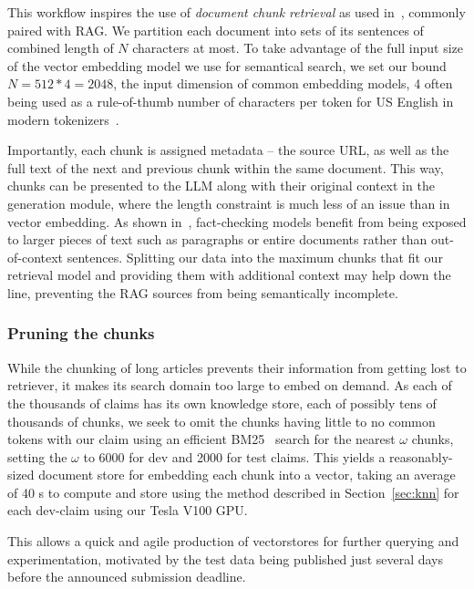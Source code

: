 This workflow inspires the use of \textit{document chunk retrieval} as used in~\cite{rag}, commonly paired with RAG.
We partition each document into sets of its sentences of combined length of $N$ characters at most.
To take advantage of the full input size of the vector embedding model we use for semantical search, we  set our bound $N=512*4=2048$,  the input dimension of common embedding models, 4 often being used as a rule-of-thumb number of characters per token for US English in modern tokenizers~\cite{tokens}.

Importantly, each chunk is  assigned metadata -- the source URL, as well as the full text of the next and previous chunk within the same document.
This way, chunks can be presented to the LLM along with their original context in the generation module, where the length constraint is much less of an issue than in vector embedding.
As shown in~\cite{drchal2023pipelinedatasetgenerationautomated}, fact-checking models benefit from being exposed to larger pieces of text such as paragraphs or entire documents rather than out-of-context sentences.
Splitting our data into the maximum chunks that fit our retrieval model and providing them with additional context may help down the line, preventing the RAG sources from being semantically incomplete.

\subsubsection{Pruning the chunks}
While the chunking of long articles prevents their information from getting lost to retriever, it makes its search domain too large to embed on demand.
As each of the thousands of claims has its own knowledge store, each of possibly tens of thousands of chunks, we seek to omit the chunks having little to no common tokens with our claim using an efficient BM25~\cite{bm25} search for the nearest $\omega$ chunks, setting the $\omega$ to 6000 for dev and 2000 for test claims. 
This yields a reasonably-sized document store for embedding each chunk into a vector, taking an average of 40 s to compute and store using the method described in Section~\ref{sec:knn} for each dev-claim using our Tesla V100 GPU.

This allows a quick and agile production of vectorstores for further querying and experimentation, motivated by the \averitec{}  test data being published just several days before the announced submission deadline.

